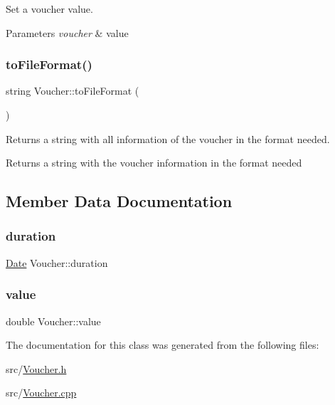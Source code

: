 Set a voucher value. 
\begin{DoxyParams}{Parameters}
{\em voucher} & value \\
\hline
\end{DoxyParams}
\hypertarget{classVoucher_abac34093e355c27735b6e7bc04bae7bb}{}\label{classVoucher_abac34093e355c27735b6e7bc04bae7bb} 
\subsubsection{\texorpdfstring{to\+File\+Format()}{toFileFormat()}}
{\footnotesize\ttfamily string Voucher\+::to\+File\+Format (\begin{DoxyParamCaption}{ }\end{DoxyParamCaption})}

Returns a string with all information of the voucher in the format needed. \begin{DoxyReturn}{Returns}
a string with the voucher information in the format needed 
\end{DoxyReturn}


\subsection{Member Data Documentation}
\hypertarget{classVoucher_a68434d1be856aa11041f21bf9036b733}{}\label{classVoucher_a68434d1be856aa11041f21bf9036b733} 
\subsubsection{\texorpdfstring{duration}{duration}}
{\footnotesize\ttfamily \hyperlink{classDate}{Date} Voucher\+::duration\hspace{0.3cm}{\ttfamily [private]}}

\hypertarget{classVoucher_a1a0c90ed8a1aac5c6a92cb1912a16572}{}\label{classVoucher_a1a0c90ed8a1aac5c6a92cb1912a16572} 
\subsubsection{\texorpdfstring{value}{value}}
{\footnotesize\ttfamily double Voucher\+::value\hspace{0.3cm}{\ttfamily [private]}}



The documentation for this class was generated from the following files\+:\begin{DoxyCompactItemize}
\item 
src/\hyperlink{Voucher_8h}{Voucher.\+h}\item 
src/\hyperlink{Voucher_8cpp}{Voucher.\+cpp}\end{DoxyCompactItemize}
